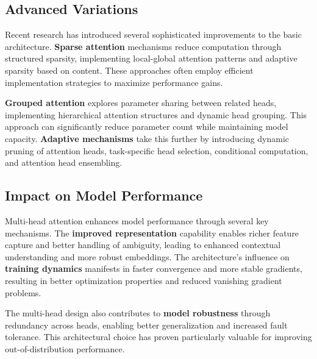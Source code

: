 \subsection{Advanced Variations}
\noindent
Recent research has introduced several sophisticated improvements to the basic architecture. \textbf{Sparse attention} mechanisms reduce computation through structured sparsity, implementing local-global attention patterns and adaptive sparsity based on content. These approaches often employ efficient implementation strategies to maximize performance gains.

\textbf{Grouped attention} explores parameter sharing between related heads, implementing hierarchical attention structures and dynamic head grouping. This approach can significantly reduce parameter count while maintaining model capacity. \textbf{Adaptive mechanisms} take this further by introducing dynamic pruning of attention heads, task-specific head selection, conditional computation, and attention head ensembling.

\subsection{Impact on Model Performance}
\noindent
Multi-head attention enhances model performance through several key mechanisms. The \textbf{improved representation} capability enables richer feature capture and better handling of ambiguity, leading to enhanced contextual understanding and more robust embeddings. The architecture's influence on \textbf{training dynamics} manifests in faster convergence and more stable gradients, resulting in better optimization properties and reduced vanishing gradient problems.

The multi-head design also contributes to \textbf{model robustness} through redundancy across heads, enabling better generalization and increased fault tolerance. This architectural choice has proven particularly valuable for improving out-of-distribution performance.

\nocite{michel2019sixteen, voita2019analyzing, raganato2018analysis}

